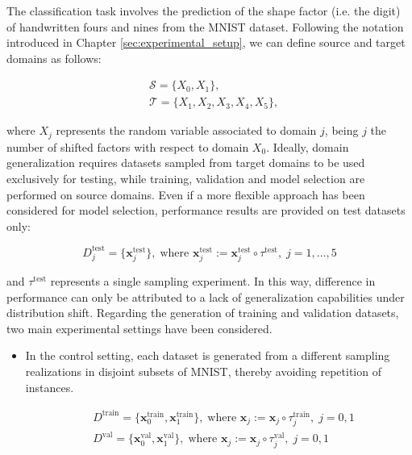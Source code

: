 \begin{definition}\label{def:diagvib6_experiments}
    The classification task involves the prediction of the shape factor (i.e. the digit)
    of handwritten fours and nines from the MNIST dataset. Following the notation introduced in
    Chapter \ref{sec:experimental_setup}, we can define source and target domains as follows:

    $$
    \begin{aligned}
        &\mathcal{S} = \{ X_0, X_1\},\\
        &\mathcal{T} = \{ X_1, X_2, X_3, X_4, X_5\},
    \end{aligned}
    $$

    where $X_j$ represents the random variable associated to domain $j$, 
    being $j$ the number of shifted factors with respect to domain $X_0$. Ideally, domain generalization
    requires datasets sampled from target domains to be used exclusively for testing, while training, validation
    and model selection are performed on source domains. Even if a more flexible approach has been
    considered for model selection, performance results are provided on test datasets only:

    $$
    D_j^{\text{test}} = \{\bm{x}_j^{\text{test}}\}, \; \text{where } \bm{x}_j^{\text{test}} := \bm{x}_j^{\text{test}} \circ \tau^{\text{test}}, \;j = 1,\dots,5
    $$

    and $\tau^{\text{test}}$ represents a single sampling experiment. In this way, difference in performance
    can only be attributed to a lack of generalization capabilities under distribution shift. Regarding the generation 
    of training and validation datasets, two main experimental settings have been considered.

    \begin{itemize}
        \item In the control setting, each dataset is generated from a different sampling realizations in 
        disjoint subsets of MNIST, thereby avoiding repetition of instances.
    
        $$
        \begin{aligned}
            &D^{\text{train}} = \{\bm{x}_0^{\text{train}}, \bm{x}_1^{\text{train}}\}, \; \text{where } \bm{x}_j := \bm{x}_j \circ \tau_j^{\text{train}}, \;j = 0,1 \\
            &D^{\text{val}} = \{\bm{x}_0^{\text{val}}, \bm{x}_1^{\text{val}}\}, \; \text{where } \bm{x}_j := \bm{x}_j \circ \tau_j^{\text{val}}, \;j=0,1 \\
        \end{aligned}
        $$


\end{itemize}
\end{definition}
